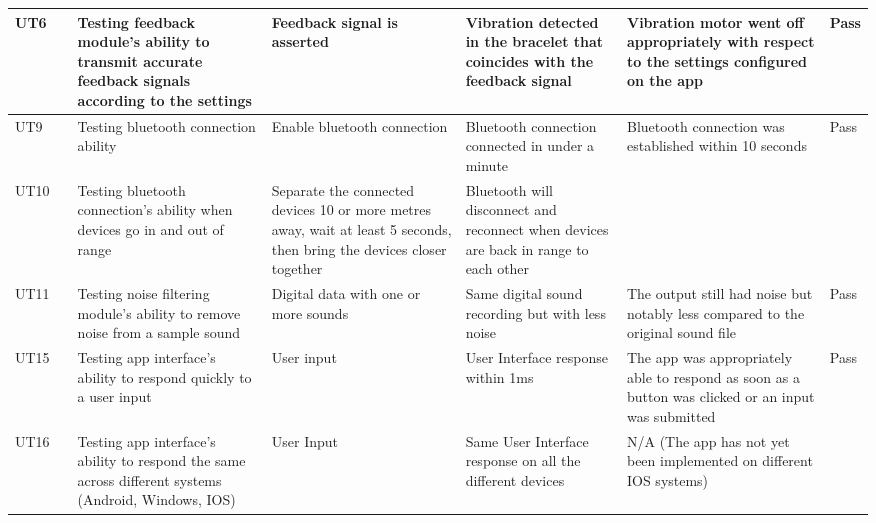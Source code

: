 \documentclass[12pt, titlepage]{article}
\begin{document}
\begin{longtable}{|p{1.1cm}|p{1cm}|p{3cm}|p{1.5cm}|p{2.5cm}|p{2cm}|p{1.2cm}|}
  UT6       &      & Testing feedback module's ability to transmit accurate feedback signals according to the settings  & Feedback signal is asserted              & Vibration detected in the bracelet that coincides with the feedback signal                          &      Vibration motor went off appropriately with respect to the settings configured on the app                        &   {\color[HTML]{32CB00} Pass}                    \\ \hline
  UT9       &      & Testing bluetooth connection ability                                     & Enable bluetooth connection                                  & Bluetooth connection connected in under a minute                    &         Bluetooth connection was established within 10 seconds               &             {\color[HTML]{32CB00} Pass}                                       \\ \hline
  UT10      &      & Testing bluetooth connection's ability when devices go in and out of range                                      & Separate the connected devices 10 or more metres away, wait at least 5 seconds, then bring the devices closer together                                  & Bluetooth will disconnect and reconnect when devices are back in range to each other                    &                      &                                                   \\ \hline
  UT11      &      & Testing noise filtering module's ability to remove noise from a sample sound                                      & Digital data with one or more sounds                                  & Same digital sound recording but with less noise                    &          The output still had noise but notably less compared to the original sound file              &                    {\color[HTML]{32CB00} Pass}                                \\ \hline
  UT15      &      & Testing app interface's ability to respond quickly to a user input                                      & User input                                  & User Interface response within 1ms                    &         The app was appropriately able to respond as soon as a button was clicked or an input was submitted               &                {\color[HTML]{32CB00} Pass}                                    \\ \hline
  UT16      &      & Testing app interface's ability to respond the same across different systems (Android, Windows, IOS)                                      & User Input                                  & Same User Interface response on all the different devices                    &        N/A (The app has not yet been implemented on different IOS systems)                &                  \cellcolor[HTML]{FFFFFF}{\color[HTML]{F8A102} N/A}                                  \\ \hline
\end{longtable}
\end{document}

